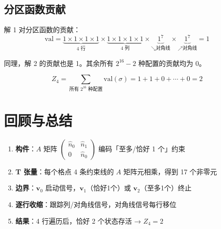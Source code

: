 \documentclass[12pt,a4paper]{article}
\newcommand{\bv}[1]{\boldsymbol{#1}}
\begin{document}
\subsection{分区函数贡献}

解 1 对分区函数的贡献：
\[
\text{val} = \underbrace{1 \times 1 \times 1 \times 1}_{\text{4 行}} \times \underbrace{1 \times 1 \times 1 \times 1}_{\text{4 列}} \times \underbrace{1^7}_{\searrow\text{对角线}} \times \underbrace{1^7}_{\nearrow\text{对角线}} = 1
\]

同理，解 2 的贡献也是 1。其余所有 $2^{16} - 2$ 种配置的贡献均为 0。

\begin{keybox}[最终结果]
\[
\boxed{Z_4 = \sum_{\text{所有 } 2^{16} \text{ 种配置}} \text{val}(\sigma) = 1 + 1 + 0 + \cdots + 0 = 2}
\]
\end{keybox}

\section{回顾与总结}

\begin{sumbox}[完整计算流程回顾]
\begin{enumerate}
  \item \textbf{构件}：$A$ 矩阵 $\begin{pmatrix}\hat{n}_0 & \hat{n}_1 \\ 0 & \hat{n}_0\end{pmatrix}$ 编码「至多/恰好 1 个」约束
  \item \textbf{T 张量}：每个格点 4 条约束线的 $A$ 矩阵元相乘，得到 17 个非零元
  \item \textbf{边界}：$\bv{v}_0$ 启动信号，$\bv{v}_1$（恰好1个）或 $\bv{v}_2$（至多1个）终止
  \item \textbf{逐行收缩}：跟踪列/对角线信号，对角线信号每行移位
  \item \textbf{结果}：4 行遍历后，恰好 2 个状态存活 → $Z_4 = 2$
\end{enumerate}
\end{sumbox}
\end{document}
